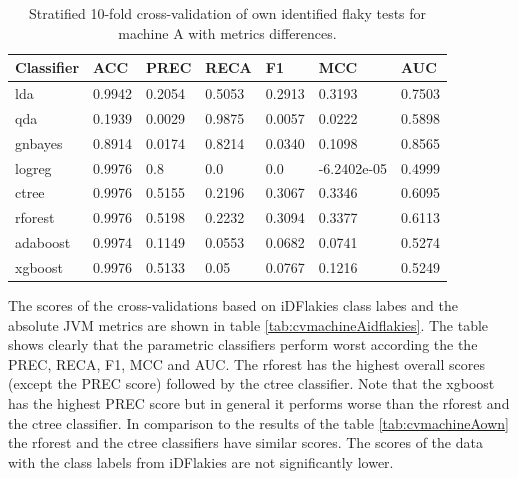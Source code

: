 \documentclass{seal_thesis}
\begin{document}
\begin{table}[ht]
\centering
\begin{tabular}{|l|l|l|l|l|l|l|}
\hline
\textbf{Classifier} & \textbf{ACC} & \textbf{PREC} & \textbf{RECA} & \textbf{F1} & \textbf{MCC} & \textbf{AUC} \\ \hline
  lda & 0.9942 & 0.2054 & 0.5053 & 0.2913 & 0.3193 & 0.7503 \\ \hline
  qda & 0.1939 & 0.0029 & 0.9875 & 0.0057 & 0.0222 & 0.5898 \\ \hline
  gnbayes & 0.8914 & 0.0174 & 0.8214 & 0.0340 & 0.1098 & 0.8565 \\ \hline
  logreg & 0.9976 & 0.8 & 0.0 & 0.0 & -6.2402e-05 & 0.4999 \\ \hline
  ctree & 0.9976 & 0.5155 & 0.2196 & 0.3067 & 0.3346 & 0.6095 \\ \hline
  rforest & 0.9976 & 0.5198 & 0.2232 & 0.3094 & 0.3377 & 0.6113 \\ \hline
  adaboost & 0.9974 & 0.1149 & 0.0553 & 0.0682 & 0.0741 & 0.5274 \\ \hline
  xgboost & 0.9976 & 0.5133 & 0.05 & 0.0767 & 0.1216 & 0.5249 \\ \hline
\end{tabular}
\caption{Stratified 10-fold cross-validation of own identified flaky tests for machine A with metrics differences.}
\label{tab:cvmachineAownDiff}
\end{table}


\noindent The scores of the cross-validations based on iDFlakies class labes and the absolute JVM metrics are shown in table \ref{tab:cvmachineAidflakies}. The table shows clearly that the parametric classifiers perform worst according the the PREC, RECA, F1, MCC and AUC. The rforest has the highest overall scores (except the PREC score) followed by the ctree classifier. Note that the xgboost has the highest PREC score but in general it performs worse than the rforest and the ctree classifier. In comparison to the results of the table \ref{tab:cvmachineAown} the rforest and the ctree classifiers have similar scores. The scores of the data with the class labels from iDFlakies are not significantly lower. \\
\end{document}
